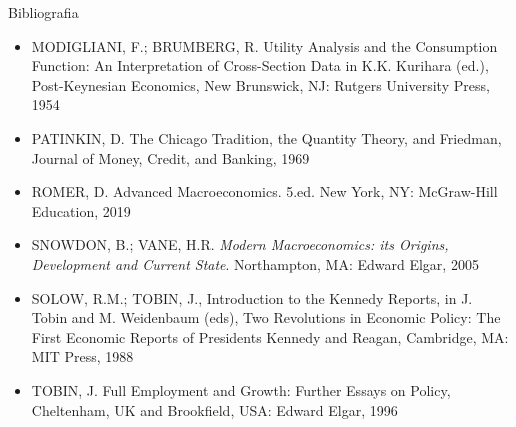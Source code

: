 \documentclass[10pt]{beamer}
\begin{document}
\begin{frame}{ Bibliografia}
    \begin{itemize}                        
        \item MODIGLIANI, F.; BRUMBERG, R. Utility Analysis and the Consumption Function: An Interpretation of Cross-Section Data in K.K. Kurihara (ed.), Post-Keynesian Economics, New Brunswick, NJ: Rutgers University Press, 1954\medskip
        \item PATINKIN, D. The Chicago Tradition, the Quantity Theory, and Friedman, Journal of Money, Credit, and Banking, 1969 \medskip
        \item ROMER, D. Advanced Macroeconomics. 5.ed. New York, NY: McGraw-Hill Education, 2019\medskip
        \item SNOWDON, B.; VANE, H.R. \emph{Modern Macroeconomics: its Origins, Development and Current State}. Northampton, MA: Edward Elgar, 2005\medskip        
        \item SOLOW, R.M.; TOBIN, J., Introduction to the Kennedy Reports, in J. Tobin and M. Weidenbaum (eds), Two Revolutions in Economic Policy: The First Economic Reports of Presidents Kennedy and Reagan, Cambridge, MA: MIT Press, 1988\medskip
        \item TOBIN, J. Full Employment and Growth: Further Essays on Policy, Cheltenham, UK and Brookfield, USA: Edward Elgar, 1996
    \end{itemize}
\end{frame}
\end{document}
